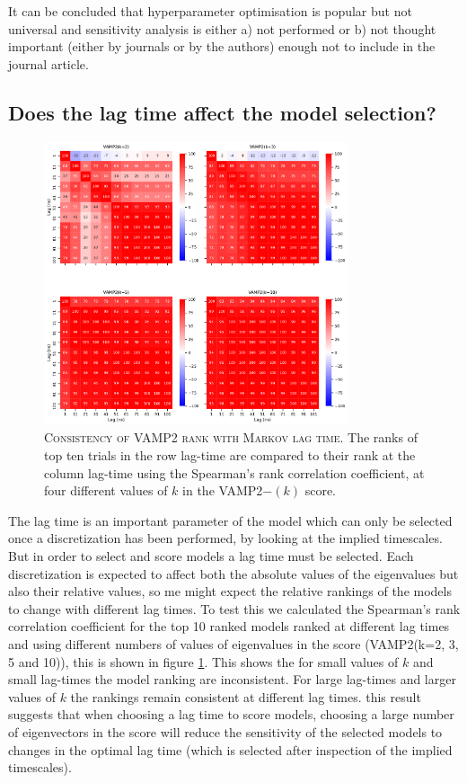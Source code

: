 \documentclass[journal=jacsat,manuscript=article]{achemso}
\begin{document}
It can be concluded that hyperparameter optimisation is popular but not universal and sensitivity analysis is either a) not performed or b) not thought important (either by journals or by the authors) enough not to include in the journal article. 


\subsection{Does the lag time affect the model selection?}

\begin{figure}
    \centering
    \includegraphics[width=0.8\textwidth]{figures/1fme_vamp_rank_vs_lag.pdf}
    \caption{\textsc{Consistency of VAMP2 rank with Markov lag time}.  The ranks of top ten trials in the row lag-time are compared to their rank at the column lag-time using the Spearman's rank correlation coefficient, at four different values of $k$ in the VAMP2$-(k)$ score.}
    \label{fig:vamp_rank_vs_lag}
\end{figure}

The lag time is an important parameter of the model which can only be selected once a discretization has been performed, by looking at the implied timescales.  But in order to select and score models a lag time must be selected. Each discretization is expected to affect both the absolute values of the eigenvalues but also their relative values, so me might expect the relative rankings of the models to change with different lag times. To test this we calculated the Spearman's rank correlation coefficient for the top 10 ranked models ranked at different lag times and using different numbers of values of eigenvalues in the score (VAMP2(k=2, 3, 5 and 10)), this is shown in figure \ref{fig:vamp_rank_vs_lag}.  This shows the for small values of $k$ and small lag-times the model ranking are inconsistent. For large lag-times and larger values of $k$ the rankings remain consistent at different lag times. this result suggests that when choosing a lag time to score models, choosing a large number of eigenvectors in the score will reduce the sensitivity of the selected models to changes in the optimal lag time (which is selected after inspection of the implied timescales). 
\end{document}
